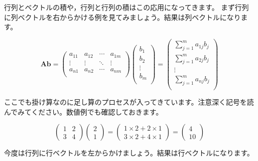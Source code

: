 \documentclass{ltjsbook}
\begin{document}
行列とベクトルの積や，行列と行列の積はこの応用になってきます。
まず行列に列ベクトルを右からかける例を見てみましょう。結果は列ベクトルになります。

\begin{equation*}
    \bm{A} \bm{b} = 
    \begin{pmatrix}
    a_{11} & a_{12} & \cdots & a_{1m}\\
    \vdots & \vdots & \ddots & \vdots \\
    a_{n1} & a_{n2} & \cdots & a_{nm}\\
    \end{pmatrix}
    \begin{pmatrix}
    b_1\\
    b_2\\
    \vdots \\
    b_m\\
    \end{pmatrix}
    =
    \begin{pmatrix}
    \sum_{j=1}^{m} a_{1j}b_{j}\\
    \sum_{j=1}^{m} a_{2j}b_{j}\\
    \vdots \\
    \sum_{j=1}^{m} a_{nj}b_{j}\\
    \end{pmatrix}
\end{equation*}


ここでも掛け算なのに足し算のプロセスが入ってきています。注意深く記号を読んでみてください。数値例でも確認しておきます。

\begin{equation*}
    \begin{pmatrix}
1 & 2\\ 3 & 4
\end{pmatrix}
\begin{pmatrix}
2\\1
\end{pmatrix}
=
\begin{pmatrix}
1 \times 2 + 2 \times 1\\
3 \times 2 + 4 \times 1
\end{pmatrix}
=
\begin{pmatrix}
4\\10
\end{pmatrix}
\end{equation*}


今度は行列に行ベクトルを左からかけましょう。結果は行ベクトルになります。
\end{document}
